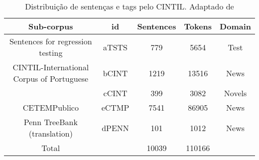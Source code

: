 \begin{table}[!ht]
    \centering
    \begin{tabular}{|c|c|c|c|c|}
    \hline
        Sub-corpus & id & Sentences & Tokens & Domain\\
    \hline
        Sentences for regression testing & aTSTS & 779 & 5654 & Test\\
        \hline
        CINTIL-International Corpus of Portuguese & bCINT & 1219 & 13516 & News\\
         & cCINT & 399 & 3082 & Novels\\
         \hline
        CETEMPublico & eCTMP & 7541 & 86905 & News\\
        \hline
        Penn TreeBank (translation) & dPENN & 101 & 1012 & News\\
        \hline
        Total &  & 10039 & 110166 & \\
    \hline
    
    \end{tabular}
    \caption[Distribuição de sentenças e tags pelo CINTIL]{Distribuição de sentenças e tags pelo CINTIL. Adaptado de }
    \label{tab:cintil_tags}
\end{table}
